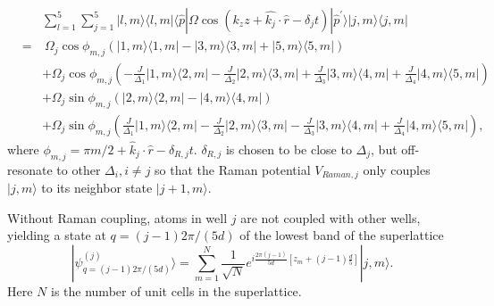 \documentclass[twocolumn,prl,floatfix,citeautoscript,nofootinbib]{revtex4}
\begin{document}
\begin{eqnarray}
&&\sum_{l=1}^{5}\sum_{j=1}^{5}|l,m\rangle \langle l,m|\langle \hat{p}|\Omega
\cos \left( k_{z}z+\hat{k_{j}}\cdot \hat{r}-\delta _{j}t\right) |\hat{p}%
^{\prime }\rangle |j,m\rangle \langle j,m|  \label{RamanTerms} \\
&=&~\Omega _{j}\cos \phi _{m,j}\left( |1,m\rangle \langle 1,m|-|3,m\rangle
\langle 3,m|+|5,m\rangle \langle 5,m|\right)  \nonumber \\
&&+\Omega _{j}\cos \phi _{m,j}\left( -\frac{J}{\Delta _{1}}|1,m\rangle
\langle 2,m|-\frac{J}{\Delta _{2}}|2,m\rangle \langle 3,m|+\frac{J}{\Delta
_{3}}|3,m\rangle \langle 4,m|+\frac{J}{\Delta _{4}}|4,m\rangle \langle
5,m|\right)  \nonumber \\
&&+\Omega _{j}\sin \phi _{m,j}\left( |2,m\rangle \langle 2,m|-|4,m\rangle
\langle 4,m|\right)  \nonumber \\
&&+\Omega _{j}\sin \phi _{m,j}\left( \frac{J}{\Delta _{1}}|1,m\rangle
\langle 2,m|-\frac{J}{\Delta _{2}}|2,m\rangle \langle 3,m|-\frac{J}{\Delta
_{3}}|3,m\rangle \langle 4,m|+\frac{J}{\Delta _{4}}|4,m\rangle \langle
5,m|\right) ,  \nonumber
\end{eqnarray}%
where $\phi _{m,j}=\pi m/2+\hat{k}_{j}\cdot \hat{r}-\delta _{R,j}t$. $\delta
_{R,j}$ is chosen to be close to $\Delta _{j}$, but off-resonate to other $%
\Delta _{i},i\neq j$ so that the Raman potential $V_{Raman,j}$ only couples $%
|j,m\rangle $ to its neighbor state $|j+1,m\rangle $.

Without Raman coupling, atoms in well $j$ are not coupled with other wells,
yielding a state at $q=(j-1)2\pi /(5d)$ of the lowest band of the
superlattice
\begin{equation}
|\psi _{q=(j-1)2\pi /(5d)}^{(j)}\rangle =\sum_{m=1}^{N}\frac{1}{\sqrt{N}}e^{i%
\frac{2\pi (j-1)}{5d}\left[ z_{m}+(j-1)\frac{d}{5}\right] }|j,m\rangle .
\end{equation}%
Here $N$ is the number of unit cells in the superlattice.
\end{document}
